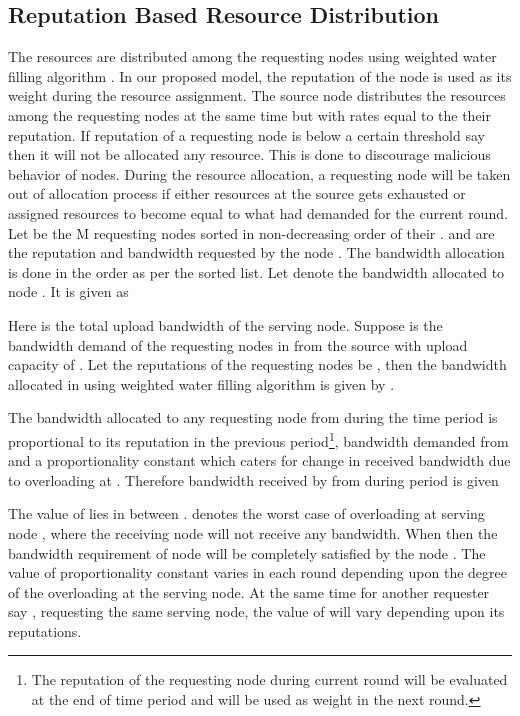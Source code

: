\documentclass[journal]{IEEEtran}
\begin{document}
\subsection{Reputation Based Resource Distribution }
\label{allocation}
The resources are distributed among the requesting nodes using weighted water filling algorithm \cite{MaKiGame}. In our proposed model, the reputation of the node is used as its weight during the resource assignment. The source node  distributes the resources among the requesting nodes at the same time but with rates equal to the their reputation.  If reputation of a requesting node is below a certain threshold say  then it will not be allocated any resource. This is done to discourage malicious behavior of nodes. During the resource allocation, a requesting node  will be taken out of allocation process if either resources at the source gets exhausted or assigned resources to  become equal to what  had demanded for the current round. Let  be the M requesting nodes sorted in non-decreasing order of their .   and  are the reputation and bandwidth requested by the node . The bandwidth allocation is done in the order as per the sorted list. Let  denote the bandwidth allocated to node . It is given as
 
Here  is the total upload bandwidth of the serving node. Suppose  is the bandwidth demand of the requesting nodes in  from the source with upload capacity of . Let the reputations of the requesting nodes be  , then the bandwidth allocated in  using weighted water filling algorithm is given by . 

The bandwidth allocated to any requesting node  from  during the  time period is proportional to its reputation  in the  previous period\footnote{The reputation of the requesting node during current round will be evaluated at the end of time period and will be used as weight in the next round.}, bandwidth demanded  from  and a proportionality constant  which caters for change in received bandwidth due to overloading at .
Therefore bandwidth received by  from  during  period is given

The value of  lies in between .  denotes the worst case of overloading at serving node , where the receiving node  will not receive any bandwidth. When  then the bandwidth requirement of node  will be completely satisfied by the node . The value of proportionality constant  varies in each round depending upon the degree of the overloading at the serving node. At the same time for another requester say , requesting the same serving node, the value of  will vary depending upon its reputations. 
\end{document}
